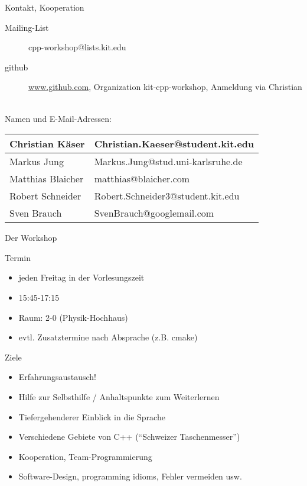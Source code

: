 \begin{frame}{Kontakt, Kooperation}
	\begin{description}
		\item[Mailing-List] cpp-workshop@lists.kit.edu
		\item[github]	\url{www.github.com}, Organization kit-cpp-workshop, Anmeldung via Christian
	\end{description}
	\ \\
	
	Namen und E-Mail-Adressen:
	\begin{table}
		\begin{tabular}{l|l}
			Christian Käser	&	Christian.Kaeser@student.kit.edu	\\
			\hline
			Markus Jung		&	Markus.Jung@stud.uni-karlsruhe.de	\\
			\hline
			Matthias Blaicher	&	matthias@blaicher.com	\\
			\hline
			Robert Schneider	&	Robert.Schneider3@student.kit.edu	\\
			\hline
			Sven Brauch	&	SvenBrauch@googlemail.com	\\
		\end{tabular}
	\end{table}
\end{frame}

\begin{frame}{Der Workshop}
	\begin{block}{Termin}
		\begin{itemize}
			\item jeden Freitag in der Vorlesungszeit
			\item 15:45-17:15
			\item Raum: 2-0 (Physik-Hochhaus)
			\item evtl. Zusatztermine nach Absprache (z.B. cmake)
		\end{itemize}
	\end{block}
	\pause
	\begin{block}{Ziele}
		\begin{itemize}
			\item Erfahrungsaustausch!
			\item Hilfe zur Selbsthilfe / Anhaltspunkte zum Weiterlernen
			\item Tiefergehenderer Einblick in die Sprache
			\item Verschiedene Gebiete von C++ (\enquote{Schweizer Taschenmesser})
			\item Kooperation, Team-Programmierung
			\item Software-Design, programming idioms, Fehler vermeiden usw.
		\end{itemize}
	\end{block}
\end{frame}

